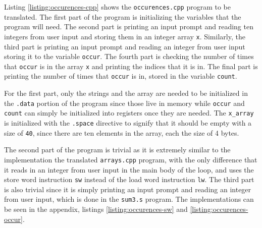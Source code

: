 \documentclass[11pt]{report}
\begin{document}
\newpage


Listing \ref{listing:occurences-cpp} shows the \verb|occurences.cpp| program to be translated. The
first part of the program is initializing the variables that the program will need. The second part
is printing an input prompt and reading ten integers from user input and storing them in an integer
array \verb|x|. Similarly, the third part is printing an input prompt and reading an integer from
user input storing it to the variable \verb|occur|. The fourth part is checking the number of times
that \verb|occur| is in the array \verb|x| and printing the indices that it is in. The final part is
printing the number of times that \verb|occur| is in, stored in the variable \verb|count|.


For the first part, only the strings and the array are needed to be initialized in the \verb|.data|
portion of the program since those live in memory while \verb|occur| and \verb|count| can simply
be initialized into registers once they are needed. The \verb|x_array| is initialized with the
\verb|.space| directive to signify that it should be empty with a size of \verb|40|, since there are
ten elements in the array, each the size of 4 bytes.

The second part of the program is trivial as it is extremely similar to the implementation the
translated \verb|arrays.cpp| program, with the only difference that it reads in an integer from user
input in the main body of the loop, and uses the store word instruction \verb|sw| instead of the
load word instruction \verb|lw|. The third part is also trivial since it is simply printing an
input prompt and reading an integer from user input, which is done in the \verb|sum3.s| program. The
implementations can be seen in the appendix, listings \ref{listing:occurences-sw} and
\ref{listing:occurences-occur}.
\end{document}
